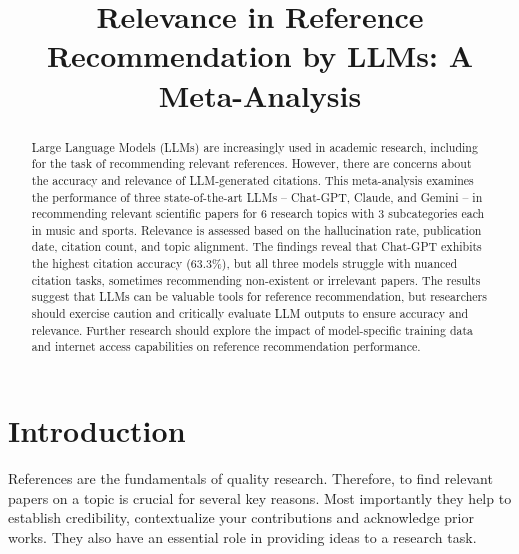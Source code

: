 \documentclass[runningheads]{llncs}
\begin{document}
\pgfplotsset{compat=1.18}

\title{Relevance in Reference Recommendation by LLMs: A Meta-Analysis}
%
%

%
\maketitle

\begin{abstract}

Large Language Models (LLMs) are increasingly used in academic research, including for the task of recommending relevant references. However, there are concerns about the accuracy and relevance of LLM-generated citations. This meta-analysis examines the performance of three state-of-the-art LLMs – Chat-GPT, Claude, and Gemini – in recommending relevant scientific papers for 6 research topics with 3 subcategories each in music and sports. Relevance is assessed based on the hallucination rate, publication date, citation count, and topic alignment. The findings reveal that Chat-GPT exhibits the highest citation accuracy (63.3\%), but all three models struggle with nuanced citation tasks, sometimes recommending non-existent or irrelevant papers. The results suggest that LLMs can be valuable tools for reference recommendation, but researchers should exercise caution and critically evaluate LLM outputs to ensure accuracy and relevance. Further research should explore the impact of model-specific training data and internet access capabilities on reference recommendation performance.


\end{abstract}

\section{Introduction}

References are the fundamentals of quality research.
Therefore, to find relevant papers on a  topic is crucial for several key reasons. Most importantly they help to establish credibility, contextualize your contributions and acknowledge prior works. They also have an essential role in providing ideas to a research task.
\end{document}
